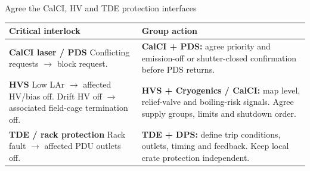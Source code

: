 \begin{frame}{Agree the CalCI, HV and TDE protection interfaces}
\renewcommand{\arraystretch}{1.15}
\begin{tabularx}{\textwidth}{@{}>{\RaggedRight\arraybackslash}p{4.4cm}>{\RaggedRight\arraybackslash}X@{}}
\toprule
\textbf{Critical interlock} & \textbf{Group action}\\\midrule
\textbf{CalCI laser / PDS}\newline
Conflicting requests $\rightarrow$ block request.
& \textbf{\color{DuneDanger}CalCI + PDS:} agree priority and emission-off or shutter-closed confirmation before PDS returns.\\[0.5ex]
\textbf{HVS}\newline
Low LAr $\rightarrow$ affected HV/bias off.\newline
Drift HV off $\rightarrow$ associated field-cage termination off.
& \textbf{\color{DuneDanger}HVS + Cryogenics / CalCI:} map level, relief-valve and boiling-risk signals. Agree supply groups, limits and shutdown order.\\[0.5ex]
\textbf{TDE / rack protection}\newline
Rack fault $\rightarrow$ affected PDU outlets off.
& \textbf{\color{DuneDanger}TDE + DPS:} define trip conditions, outlets, timing and feedback. Keep local crate protection independent.\\
\bottomrule
\end{tabularx}\par\smallskip
{}
\end{frame}

